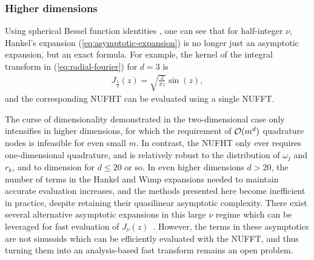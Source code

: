 
\subsubsection{Higher dimensions}

Using spherical Bessel function identities \cite[10.47.3,
10.49.2]{olver2010nist}, one can see that for half-integer $\nu$, Hankel's
expansion (\ref{eq:asymptotic-expansion}) is no longer just an asymptotic
expansion, but an exact formula.
For example, the kernel of the integral transform in (\ref{eq:radial-fourier})
for $d = 3$ is
\begin{align}
  J_{\frac{1}{2}}(z) = \sqrt{\frac{2}{\pi z}} \sin(z),
\end{align}
and the corresponding NUFHT can be evaluated using a single NUFFT.

The curse of dimensionality demonstrated in the two-dimensional case only
intensifies in higher dimensions, for which the requirement of $\mathcal{O}(m^d)$
quadrature nodes is infeasible for even small $m$. In contrast, the NUFHT only
ever requires one-dimensional quadrature, and is relatively robust to the
distribution of $\omega_j$ and $r_k$, and to dimension for $d \leq 20$ or so. In
even higher dimensions $d > 20$, the number of terms in the Hankel and Wimp
expansions needed to maintain accurate evaluation increases, and the methods
presented here become inefficient in practice, despite retaining their
quasilinear asymptotic complexity. There exist several alternative asymptotic
expansions in this large $\nu$ regime which can be leveraged for fast evaluation
of $J_\nu(z)$~\cite{heitman2015asymptotics, olver2010nist}.
However, the terms in these asymptotics are not sinusoids which can be
efficiently evaluated with the NUFFT, and thus turning them into an
analysis-based fast transform remains an open problem.
